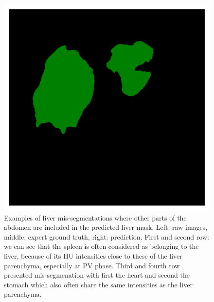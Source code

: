 {\begin{figure}[!ht]
\begin{mdframed}[backgroundcolor=blue!50,linecolor=blue!50]
\begin{minipage}{4cm}
	\end{minipage} \hspace{-0.3cm}
	\begin{minipage}{4cm}
		\includegraphics[width=\linewidth]{images/LiverVE_Pred_Pat1_1}
	\end{minipage}
	\caption{Examples of liver mis-segmentations where other parts of the abdomen are included in the predicted liver mask. Left: raw images, middle: expert ground truth, right: prediction. First and second row: we can see that the spleen is often considered as belonging to the liver, because of its HU intensities close to these of the liver parenchyma, especially at PV phase. Third and fourth row presented mis-segmenation with first the heart and second the stomach which also often share the same intensities as the liver parenchyma.}
	\label{fig:missegmentation_Liver_IJCARS}
	\end{mdframed}
\end{figure}
\begin{figure}[!ht]
	\begin{mdframed}[backgroundcolor=blue!50,linecolor=blue!50]
	\centering
	\begin{minipage}{4cm}

\end{minipage}
\end{mdframed}
\end{figure}}
